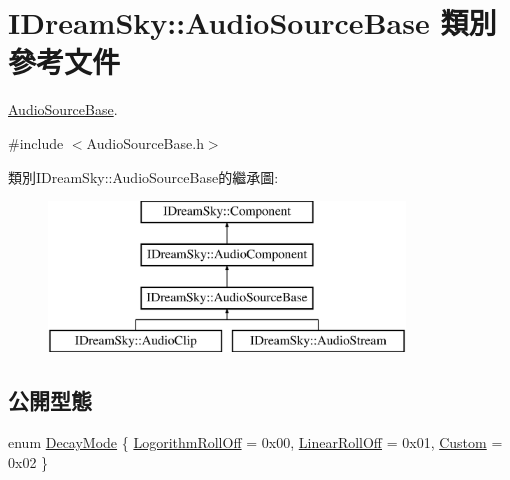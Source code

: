 \hypertarget{class_i_dream_sky_1_1_audio_source_base}{}\section{I\+Dream\+Sky\+:\+:Audio\+Source\+Base 類別 參考文件}
\label{class_i_dream_sky_1_1_audio_source_base}


\hyperlink{class_i_dream_sky_1_1_audio_source_base}{Audio\+Source\+Base}.  




{\ttfamily \#include $<$Audio\+Source\+Base.\+h$>$}

類別\+I\+Dream\+Sky\+:\+:Audio\+Source\+Base的繼承圖\+:\begin{figure}[H]
\begin{center}
\leavevmode
\includegraphics[height=4.000000cm]{class_i_dream_sky_1_1_audio_source_base}
\end{center}
\end{figure}
\subsection*{公開型態}
\begin{DoxyCompactItemize}
\item 
enum \hyperlink{class_i_dream_sky_1_1_audio_source_base_a037f40be30e9c7a8788f3caefe38e252}{Decay\+Mode} \{ \hyperlink{class_i_dream_sky_1_1_audio_source_base_a037f40be30e9c7a8788f3caefe38e252addc84db1ed4ba7fbb59ac91cf3f8d78e}{Logorithm\+Roll\+Off} = 0x00, 
\hyperlink{class_i_dream_sky_1_1_audio_source_base_a037f40be30e9c7a8788f3caefe38e252af65f1a10a15a1674aa06351516cd7e3b}{Linear\+Roll\+Off} = 0x01, 
\hyperlink{class_i_dream_sky_1_1_audio_source_base_a037f40be30e9c7a8788f3caefe38e252a937d491086ae3548aded20a21f2cc9e8}{Custom} = 0x02
 \}
\end{DoxyCompactItemize}
